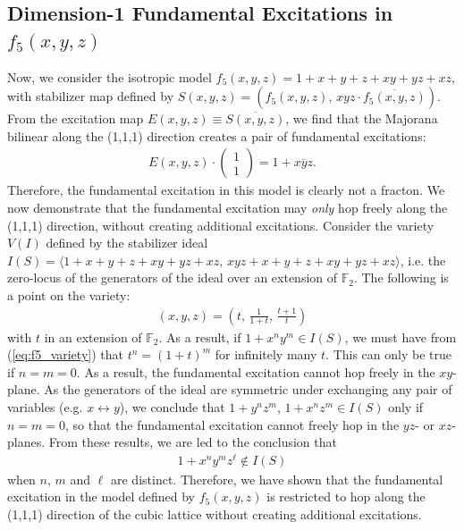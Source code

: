 \documentclass[aps,twocolumn,preprintnumbers,floatfix,showpacs,prx]{revtex4-1}
\begin{document}
\subsection{Dimension-1 Fundamental Excitations in $f_{5}(x,y,z)$}
Now, we consider the isotropic model $f_{5}(x,y,z) = 1 + x + y + z + xy + yz + xz$,
with stabilizer map defined by $S(x,y,z) = \left(f_{5}(x,y,z),\,xyz\cdot\overline{f_{5}(x,y,z)}\right)$.
From the excitation map $E(x,y,z) \equiv \overline{S(x,y,z)}$,
we find that the Majorana bilinear along the (1,1,1) direction creates a pair of fundamental excitations:
\begin{align}\label{eq:111_String}
E(x,y,z)\cdot\left(\begin{array}{c} 1\\ 1\end{array}\right) = 1 + \overline{xyz}.
\end{align}  
Therefore, the fundamental excitation in this model is clearly not a fracton.  We now demonstrate that the fundamental excitation may \emph{only} hop freely along the (1,1,1) direction, without creating additional excitations. Consider the variety $V(I)$ defined by the stabilizer ideal $I(S) = \langle 1 + x + y + z + xy + yz + xz,\,xyz + x + y + z + xy + yz + xz \rangle $, i.e. the zero-locus of the generators of the ideal over an extension of $\mathbb{F}_{2}$.  The following is a point on the variety:
\begin{align}\label{eq:f5_variety}
(x,y,z) = \left(t,\,\frac{1}{1+t},\,\frac{t+1}{t} \right)
\end{align}
with $t$ in an extension of $\mathbb{F}_{2}$.  As a result, if $1 + x^{n}y^{m}\in I(S)$, we must have from (\ref{eq:f5_variety}) that $t^{n} = (1 + t)^{m}$ for infinitely many $t$.  This can only be true if $n = m = 0$. As a result, the fundamental excitation cannot hop freely in the $xy$-plane.  As the generators of the ideal are symmetric under exchanging any pair of variables (e.g. $x\longleftrightarrow y$), we conclude that $1 + y^{n}z^{m}$, $1 + x^{n}z^{m}\in I(S)$ only if $n = m = 0$, so that the fundamental excitation cannot freely hop in the $yz$- or $xz$-planes.  From these results, we are led to the conclusion that
\begin{align}
1 + x^{n}y^{m}z^{\ell}\notin I(S)
\end{align}
when $n$, $m$ and $\ell$ are distinct.  Therefore, we have shown that the fundamental excitation in the model defined by $f_{5}(x,y,z)$ is restricted to hop along the (1,1,1) direction of the cubic lattice without creating additional excitations.
\end{document}
